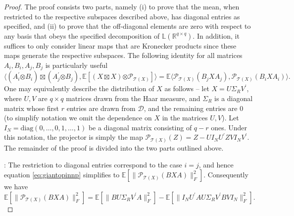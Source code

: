 \documentclass[11pt,letterpaper]{article}
\newcommand{\R}{\mathbb{R}}
\newcommand{\botimes}{\boldsymbol \otimes}
\newcommand{\ct}{\mathcal{T}}
\newcommand{\cp}{\mathcal{P}}
\begin{document}
\begin{proof}
	The proof consists two parts, namely (i) to prove that the mean, when restricted to the respective subspaces described above, has diagonal entries as specified, and (ii) to prove that the off-diagonal elements are zero with respect to any basis that obeys the specified decomposition of $\mathbb{L}(\R^{q\times q})$.  In addition, it suffices to only consider linear maps that are Kronecker products since these maps generate the respective subspaces.  The following identity for all matrices $A_i,B_i,A_j,B_j$ is particularly useful
	\begin{equation}\label{eq:giantopinnp}
		\langle (A^{\prime}_i \botimes B_i) \boxtimes (A_j^{\prime} \botimes B_j) ,  \mathbb{E} [(X \boxtimes X) \botimes \cp_{\ct(X)}]\rangle = \mathbb{E}  \langle \cp_{\ct(X)} (B_j X A_j), \cp_{\ct(X)}(B_i X A_i) \rangle .
	\end{equation}
	One may equivalently describe the distribution of $X$ as follows -- let $X = U \Sigma_R V^{\prime}$, where $U,V$ are $q\times q$ matrices drawn from the Haar measure, and $\Sigma_R$ is a diagonal matrix whose first $r$ entries are drawn from $\mathcal{D}$, and the remaining entries are $0$ (to simplify notation we omit the dependence on $X$ in the matrices $U,V$).  Let $I_N = \mathrm{diag}(0,\ldots, 0, 1,\ldots ,1)$ be a diagonal matrix consisting of $q-r$ ones. Under this notation, the projector is simply the map $\cp_{\ct(X)} (Z) = Z - U I_N U^{\prime}ZV I_N V^{\prime} $.  The remainder of the proof is divided into the two parts outlined above.
	
	\noindent [Part (i)]: The restriction to diagonal entries correspond to the case $i=j$, and hence equation \eqref{eq:giantopinnp} simplifies to $\mathbb{E}  [\| \cp_{\ct(X)} (B X A) \|^2_F ]$.  Consequently we have
	\begin{equation*}
		\mathbb{E}  [\| \cp_{\ct(X)} (B X A) \|^2_F ] = \mathbb{E} [\|B U \Sigma_R V^{\prime} A \|^2_F ] - \mathbb{E} [ \| I_N U^{\prime} A U \Sigma_R V^{\prime} B V I_N \|_F^2  ].
	\end{equation*}
	

\end{proof}
\end{document}
